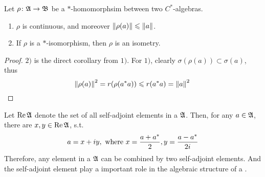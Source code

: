 \documentclass[a4paper,11pt]{report}
\begin{document}
\begin{prop} \label{prop8}
	Let $\rho \colon \mathfrak{A} \rightarrow \mathfrak{B}$ be a $*$-homomorphsim between two $C^{*}$-algebras.
	\begin{enumerate}[label=\arabic*)]
		\item $\rho$ is continuous, and moreover $\left\lVert\rho(a)\right\lVert \leqslant \left\lVert a\right\lVert$.
		\item If $\rho$ is a $*$-isomorphism, then $\rho$ is an isometry.
	\end{enumerate}
\end{prop}
\begin{proof}
	$2)$ is the direct corollary from $1)$. For $1)$, clearly $\sigma(\rho(a)) \subset \sigma(a)$, thus
	\begin{equation*}
		\left\lVert\rho(a)\right\lVert^{2} = r(\rho(a^{*}a)) \leqslant r(a^{*}a) = \left\lVert a\right\lVert^{2} \qedhere
	\end{equation*}
\end{proof}

Let $\operatorname{Re}{\mathfrak{A}}$ denote the set of all self-adjoint elements in a \Cs $\mathfrak{A}$. Then, for any $a \in \mathfrak{A}$, there are $x,y \in \operatorname{Re}{\mathfrak{A}}$, s.t.
\begin{equation*}
	a = x + iy, \text{ where } x = \frac{a + a^{*}}{2}, y = \frac{a-a^{*}}{2i}
\end{equation*}
Therefore, any element in a \Cs $\mathfrak{A}$ can be combined by two self-adjoint elements. And the self-adjoint element play a important role in the algebraic structure of a \Cs. 
\end{document}
